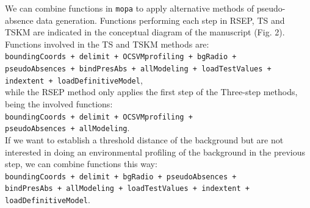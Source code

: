 \documentclass[10pt,a4paper]{article}\usepackage[]{graphicx}\usepackage[]{color}
\begin{document}
% 
% 

We can combine functions in \texttt{mopa} to apply alternative methods of pseudo-absence data generation. 
Functions performing each step in RSEP, TS and TSKM are indicated in the conceptual diagram of the manuscript (Fig. 2). Functions involved in the TS and TSKM methods are:\\

  \texttt{boundingCoords + delimit + OCSVMprofiling + bgRadio + \\
  pseudoAbsences + bindPresAbs + allModeling + loadTestValues +\\
  indextent + loadDefinitiveModel},\\  

while the RSEP method only applies the first step of the Three-step methods, being the involved functions:\\

  \texttt{boundingCoords + delimit + OCSVMprofiling + \\
  pseudoAbsences + allModeling}. \\
 
If we want to establish a threshold distance of the background but are not interested in doing an environmental profiling of the background in the previous step, we can combine functions this way:\\

  \texttt{boundingCoords + delimit + bgRadio + pseudoAbsences +\\ 
  bindPresAbs + allModeling + loadTestValues + indextent +\\
  loadDefinitiveModel}.
\end{document}
